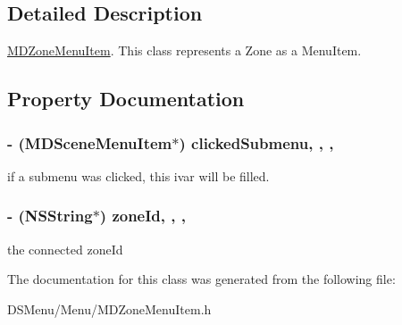 \subsection{Detailed Description}
\hyperlink{interface_m_d_zone_menu_item}{M\-D\-Zone\-Menu\-Item}. This class represents a Zone as a Menu\-Item. 

\subsection{Property Documentation}
\hypertarget{interface_m_d_zone_menu_item_a6a4957a6b3fe720a65aa67f6c07be18f}{
\subsubsection[{clicked\-Submenu}]{\setlength{\rightskip}{0pt plus 5cm}-\/ ({\bf M\-D\-Scene\-Menu\-Item}$\ast$) clicked\-Submenu\hspace{0.3cm}{\ttfamily [read]}, {\ttfamily [write]}, {\ttfamily [atomic]}, {\ttfamily [strong]}}}\label{interface_m_d_zone_menu_item_a6a4957a6b3fe720a65aa67f6c07be18f}
if a submenu was clicked, this ivar will be filled. \hypertarget{interface_m_d_zone_menu_item_a0233a890891b84a2c30226439a3185ea}{
\subsubsection[{zone\-Id}]{\setlength{\rightskip}{0pt plus 5cm}-\/ (N\-S\-String$\ast$) zone\-Id\hspace{0.3cm}{\ttfamily [read]}, {\ttfamily [write]}, {\ttfamily [atomic]}, {\ttfamily [strong]}}}\label{interface_m_d_zone_menu_item_a0233a890891b84a2c30226439a3185ea}
the connected zone\-Id 

The documentation for this class was generated from the following file\-:\begin{DoxyCompactItemize}
\item 
D\-S\-Menu/\-Menu/M\-D\-Zone\-Menu\-Item.\-h\end{DoxyCompactItemize}
